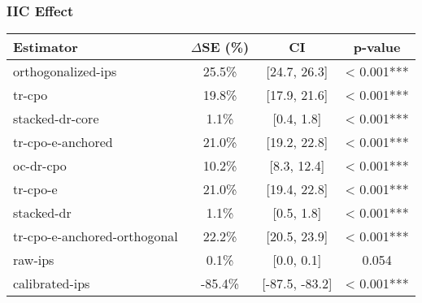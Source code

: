 \subsubsection{IIC Effect}
\begin{tabular}{l|ccc}
\toprule
Estimator & $\Delta$SE (\%) & CI & p-value \\
\midrule
orthogonalized-ips & 25.5\% & [24.7, 26.3] & < 0.001*** \\
tr-cpo & 19.8\% & [17.9, 21.6] & < 0.001*** \\
stacked-dr-core & 1.1\% & [0.4, 1.8] & < 0.001*** \\
tr-cpo-e-anchored & 21.0\% & [19.2, 22.8] & < 0.001*** \\
oc-dr-cpo & 10.2\% & [8.3, 12.4] & < 0.001*** \\
tr-cpo-e & 21.0\% & [19.4, 22.8] & < 0.001*** \\
stacked-dr & 1.1\% & [0.5, 1.8] & < 0.001*** \\
tr-cpo-e-anchored-orthogonal & 22.2\% & [20.5, 23.9] & < 0.001*** \\
raw-ips & 0.1\% & [0.0, 0.1] & 0.054 \\
calibrated-ips & -85.4\% & [-87.5, -83.2] & < 0.001*** \\
\bottomrule
\end{tabular}